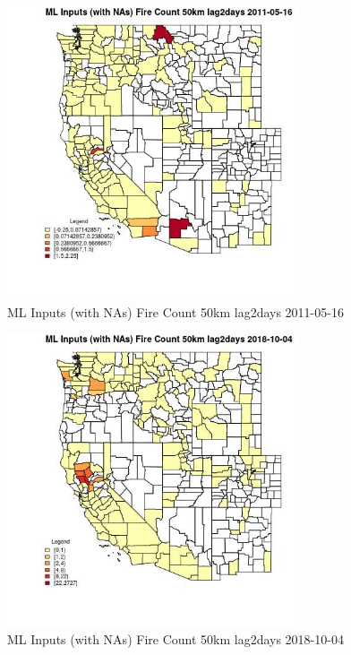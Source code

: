 \begin{figure} 
\centering  
\includegraphics[width=0.77\textwidth]{Code_Outputs/Report_ML_input_PM25_Step4_part_f_de_duplicated_aves_prioritize_24hr_obswNAs_CountyFire_Count_50km_lag2daysMean2011-05-16.jpg} 
\caption{\label{fig:Report_ML_input_PM25_Step4_part_f_de_duplicated_aves_prioritize_24hr_obswNAsCountyFire_Count_50km_lag2daysMean2011-05-16}ML Inputs (with NAs) Fire Count 50km lag2days 2011-05-16} 
\end{figure} 
 

\begin{figure} 
\centering  
\includegraphics[width=0.77\textwidth]{Code_Outputs/Report_ML_input_PM25_Step4_part_f_de_duplicated_aves_prioritize_24hr_obswNAs_CountyFire_Count_50km_lag2daysMean2018-10-04.jpg} 
\caption{\label{fig:Report_ML_input_PM25_Step4_part_f_de_duplicated_aves_prioritize_24hr_obswNAsCountyFire_Count_50km_lag2daysMean2018-10-04}ML Inputs (with NAs) Fire Count 50km lag2days 2018-10-04} 
\end{figure} 
 

